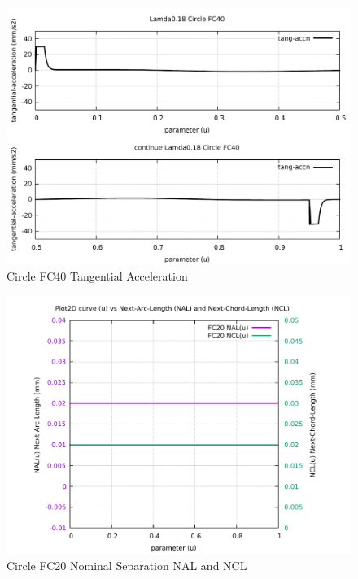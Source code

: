 \begin{figure}
	\caption     {Circle FC40 Tangential Acceleration}
	\label{24-img-Circle-FC40-Tangential-Acceleration.pdf}
	\includegraphics[width=1.00\textwidth]{Chap4/appendix/app-Circle/plots/24-img-Circle-FC40-Tangential-Acceleration.pdf}
\end{figure}

\clearpage
\pagebreak

\begin{figure}
	\caption     {Circle FC20 Nominal Separation NAL and NCL}
	\label{25-img-Circle-FC20-Nominal-Separation-NAL-and-NCL.pdf}
	\includegraphics[width=1.00\textwidth]{Chap4/appendix/app-Circle/plots/25-img-Circle-FC20-Nominal-Separation-NAL-and-NCL.pdf}
\end{figure}


